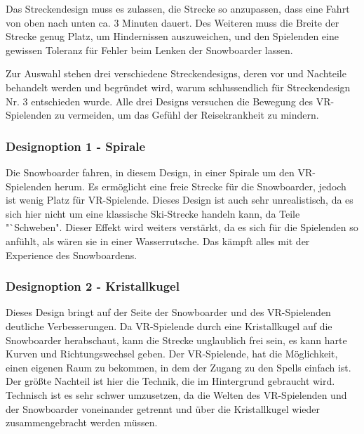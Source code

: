 Das Streckendesign muss es zulassen, die Strecke so anzupassen, dass eine Fahrt von oben nach unten ca. 3 Minuten dauert. Des Weiteren muss die Breite der Strecke genug Platz, um Hindernissen auszuweichen, und den Spielenden eine gewissen Toleranz für Fehler beim Lenken der Snowboarder lassen.

Zur Auswahl stehen drei verschiedene Streckendesigns, deren vor und Nachteile behandelt werden und begründet wird, warum schlussendlich für Streckendesign Nr. 3 entschieden wurde. Alle drei Designs versuchen die Bewegung des VR-Spielenden zu vermeiden, um das Gefühl der Reisekrankheit zu mindern.

\subsubsection{Designoption 1 - Spirale}
Die Snowboarder fahren, in diesem Design, in einer Spirale um den VR-Spielenden herum. Es ermöglicht eine freie Strecke für die Snowboarder, jedoch ist wenig Platz für VR-Spielende. Dieses Design ist auch sehr unrealistisch, da es sich hier nicht um eine klassische Ski-Strecke handeln kann, da Teile "`Schweben". Dieser Effekt wird weiters verstärkt, da es sich für die Spielenden so anfühlt, als wären sie in einer Wasserrutsche. Das kämpft alles mit der Experience des Snowboardens.

\subsubsection{Designoption 2 - Kristallkugel}
Dieses Design bringt auf der Seite der Snowboarder und des VR-Spielenden deutliche Verbesserungen. Da VR-Spielende durch eine Kristallkugel auf die Snowboarder herabschaut, kann die Strecke unglaublich frei sein, es kann harte Kurven und Richtungswechsel geben. Der VR-Spielende, hat die Möglichkeit, einen eigenen Raum zu bekommen, in dem der Zugang zu den Spells einfach ist. Der größte Nachteil ist hier die Technik, die im Hintergrund gebraucht wird. Technisch ist es sehr schwer umzusetzen, da die Welten des VR-Spielenden und der Snowboarder voneinander getrennt und über die Kristallkugel wieder zusammengebracht werden müssen.

